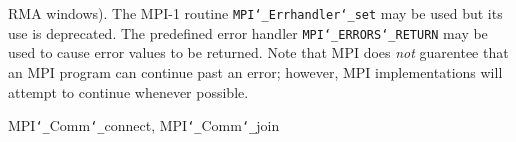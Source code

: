 RMA windows).  The MPI-1 routine {\tt MPI{\tt \char`\_}Errhandler{\tt \char`\_}set} may be used but
its use is deprecated.  The predefined error handler
{\tt MPI{\tt \char`\_}ERRORS{\tt \char`\_}RETURN} may be used to cause error values to be returned.
Note that MPI does {\em not} guarentee that an MPI program can continue past
an error; however, MPI implementations will attempt to continue whenever
possible.
\par
{}
\par
{}
MPI{\tt \char`\_}Comm{\tt \char`\_}connect, MPI{\tt \char`\_}Comm{\tt \char`\_}join
\nextline
{}
\endmanpage
